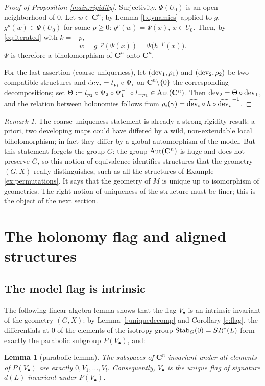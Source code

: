 \documentclass[english,11pt]{amsart}
\newtheorem{lemma}[theorem]{Lemma}
\theoremstyle{definition}
\theoremstyle{remark}
\newtheorem{remark}[theorem]{Remark}
\numberwithin{equation}{section}
\newcommand{\C}{\mathbf{C}}
\newcommand{\Aut}{\mathop{\rm Aut}}
\newcommand{\Stab}{\mathop{\rm Stab}}
\newcommand{\dev}{\mathop{\rm dev}\nolimits}
\begin{document}
\begin{proof}[Proof of Proposition \ref{main:rigidity}]
Surjectivity. $\Psi(U_0)$ is an open neighborhood of $0$. Let $w\in\C^n$; by Lemma \ref{l:dynamics} applied to $g$, $g^{p}(w)\in\Psi(U_0)$ for some $p\ge0$: $g^{p}(w)=\Psi(x)$, $x\in U_0$. Then, by \eqref{eq:iterated} with $k=-p$,
\[
w=g^{-p}(\Psi(x))=\Psi\big(h^{-p}(x)\big).
\]
$\Psi$ is therefore a biholomorphism of $\C^n$ onto $\C^n$.

For the last assertion (coarse uniqueness), let $(\dev_1,\rho_1)$ and $(\dev_2,\rho_2)$ be two compatible structures and $\dev_i=t_{p_i}\circ\Psi_i$ on $\C^n\setminus\{0\}$ the corresponding decompositions; set $\Theta:=t_{p_2}\circ\Psi_2\circ\Psi_1^{-1}\circ t_{-p_1}\in\Aut(\C^n)$. Then $\dev_2=\Theta\circ\dev_1$, and the relation between holonomies follows from $\rho_i(\gamma)=\widehat{\dev_i}\circ h\circ\widehat{\dev_i}^{\,-1}$.
\end{proof}

\begin{remark}
The coarse uniqueness statement is already a strong rigidity result: a priori, two developing maps could have differed by a wild, non-extendable local biholomorphism; in fact they differ by a global automorphism of the model. But this statement forgets the group $G$: the group $\Aut(\C^n)$ is huge and does not preserve $G$, so this notion of equivalence identifies structures that the geometry $(G,X)$ really distinguishes, such as all the structures of Example \ref{ex:permutations}. It says that the geometry of $M$ is unique up to isomorphism of geometries. The right notion of uniqueness of the structure must be finer; this is the object of the next section.
\end{remark}

\section{The holonomy flag and aligned structures}\label{s:flag}

\subsection{The model flag is intrinsic}

The following linear algebra lemma shows that the flag $V_\bullet$ is an intrinsic invariant of the geometry $(G,X)$: by Lemma \ref{l:uniquedecomp} and Corollary \ref{c:flag}, the differentials at $0$ of the elements of the isotropy group $\Stab_G(0)=SR^*(L)$ form exactly the parabolic subgroup $P(V_\bullet)$, and:

\begin{lemma}[parabolic lemma]\label{l:parabolic}
The subspaces of $\C^n$ invariant under all elements of $P(V_\bullet)$ are exactly $0,V_1,\dots,V_l$. Consequently, $V_\bullet$ is the unique flag of signature $d(L)$ invariant under $P(V_\bullet)$.
\end{lemma}
\end{document}
